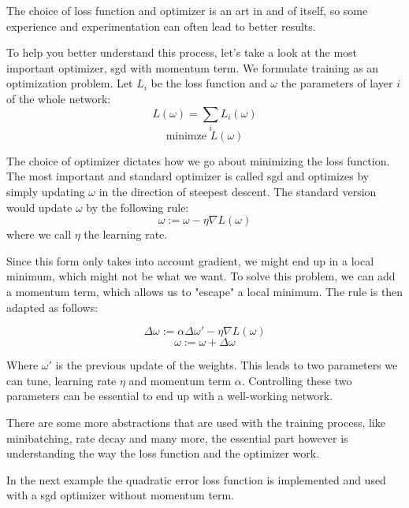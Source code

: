 \documentclass[parskip=half,notes,cadrem,toolver]{iisvlsi}
\begin{document}
The choice of loss function and optimizer is an art in and of itself, so some experience and experimentation can often lead to better results. 

To help you better understand this process, let's take a look at the most important optimizer, \gls{sgd} with momentum term. We formulate training as an optimization problem. Let $L_{i}$ be the loss function and $\omega$ the parameters of layer $i$ of the whole network:
$$ L(\omega) = \sum_{i} L_{i}(\omega) $$
$$\text{minimze } L(\omega)$$

The choice of optimizer dictates how we go about minimizing the loss function. The most important and standard optimizer is called \gls{sgd} and optimizes by simply updating $\omega$ in the direction of steepest descent.
The standard version would update $\omega$ by the following rule:
$$\omega := \omega - \eta \nabla L(\omega)$$
where we call $\eta$ the learning rate.

Since this form only takes into account gradient, we might end up in a local minimum, which might not be what we want. To solve this problem, we can add a momentum term, which allows us to "escape" a local minimum. The rule is then adapted as follows:

$$ \Delta\omega := \alpha\Delta\omega' - \eta\nabla L(\omega) $$
$$ \omega := \omega + \Delta\omega $$

Where $\omega'$ is the previous update of the weights. This leads to two parameters we can tune, learning rate $\eta$ and momentum term $\alpha$. Controlling these two parameters can be essential to end up with a well-working network.

There are some more abstractions that are used with the training process, like minibatching, rate decay and many more, the essential part however is understanding the way the loss function and the optimizer work. 

In the next example the quadratic error loss function is implemented and used with a \gls{sgd} optimizer without momentum term.
\end{document}
